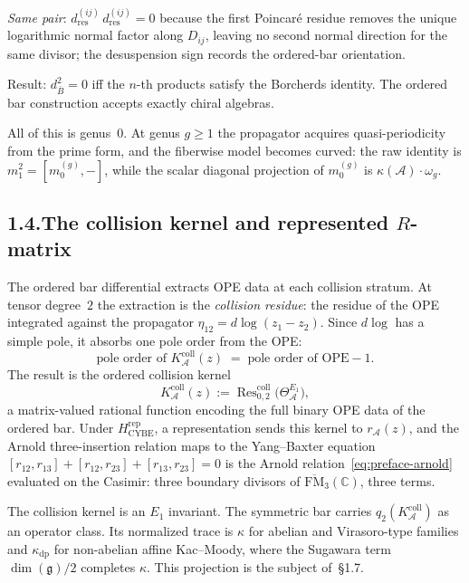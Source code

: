 \documentclass[11pt,reqno]{amsart}
\theoremstyle{definition}
\theoremstyle{remark}
\providecommand{\cA}{\mathcal{A}}
\providecommand{\barB}{\bar{B}}
\providecommand{\fg}{\mathfrak{g}}
\providecommand{\bC}{\mathbb{C}}
\numberwithin{equation}{section}
\begin{document}
\emph{Same pair}: $d_{\mathrm{res}}^{(ij)}\,d_{\mathrm{res}}^{(ij)}=0$
because the first Poincar\'e residue removes the unique logarithmic
normal factor along \(D_{ij}\), leaving no second normal direction for
the same divisor; the desuspension sign records the ordered-bar
orientation.

Result: $d_{\barB}^2=0$ iff the $n$-th products satisfy the Borcherds
identity. The ordered bar construction accepts exactly chiral algebras.

All of this is genus~$0$. At genus $g\ge 1$ the propagator acquires
quasi-periodicity from the prime form, and the fiberwise model becomes
curved: the raw identity is $m_1^2=[m_0^{(g)},-]$, while the scalar
diagonal projection of $m_0^{(g)}$ is
$\kappa(\cA)\cdot\omega_g$.

\subsection*{1.4.\enspace The collision kernel and represented $R$-matrix}

The ordered bar differential extracts OPE data at each collision
stratum. At tensor degree~$2$ the extraction is the \emph{collision
residue}: the residue of the OPE integrated against the propagator
$\eta_{12}=d\log(z_1-z_2)$. Since $d\log$ has a simple pole, it
absorbs one pole order from the OPE:
\begin{equation}\label{eq:pole-absorption}
\text{pole order of }K_\cA^{\mathrm{coll}}(z)
\;=\; \text{pole order of OPE} - 1.
\end{equation}
The result is the ordered collision kernel
\[
K_\cA^{\mathrm{coll}}(z)
:=\operatorname{Res}^{\mathrm{coll}}_{0,2}
\bigl(\Theta^{E_1}_{\cA}\bigr),
\]
a matrix-valued rational function encoding the full binary OPE data
of the ordered bar. Under $H_{\mathrm{CYBE}}^{\mathrm{rep}}$, a
representation sends this kernel to $r_\cA(z)$, and the Arnold
three-insertion relation maps to the Yang--Baxter equation
$[r_{12},r_{13}]+[r_{12},r_{23}]+[r_{13},r_{23}]=0$ is the
Arnold relation~\eqref{eq:preface-arnold} evaluated on the
Casimir: three boundary divisors of $\overline{\mathrm{FM}}_3(\bC)$,
three terms.

The collision kernel is an $E_1$ invariant. The symmetric bar carries
$q_2(K_\cA^{\mathrm{coll}})$ as an operator class. Its normalized
trace is $\kappa$ for abelian and Virasoro-type families and
$\kappa_{\mathrm{dp}}$ for non-abelian affine Kac--Moody, where the
Sugawara term $\dim(\fg)/2$ completes $\kappa$. This projection is the subject
of~\S1.7.
\end{document}
